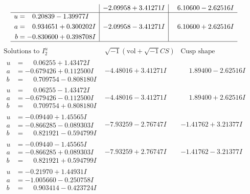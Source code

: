 \documentclass[1p]{elsarticle_modified}
\theoremstyle{definition}
\newcommand{\I}{\sqrt{-1}}
\begin{document}
$$\begin{array}{c|c|c}
 & -2.09958 + 3.41271 I & \phantom{-}6.10600 - 2.62516 I \\ \hline\begin{aligned}
u &= \phantom{-}0.20839 - 1.39977 I \\
a &= \phantom{-}0.934651 + 0.300202 I \\
b &= -0.830600 + 0.398708 I\end{aligned}
 & -2.09958 - 3.41271 I & \phantom{-}6.10600 + 2.62516 I\\
 \hline 
 \end{array}$$\newpage$$\begin{array}{c|c|c}  
\text{Solutions to }I^u_{2}& \I (\text{vol} + \sqrt{-1}CS) & \text{Cusp shape}\\
 \hline 
\begin{aligned}
u &= \phantom{-}0.06255 + 1.43472 I \\
a &= -0.679426 + 0.112500 I \\
b &= \phantom{-}0.709754 - 0.808180 I\end{aligned}
 & -4.48016 + 3.41271 I & \phantom{-}1.89400 - 2.62516 I \\ \hline\begin{aligned}
u &= \phantom{-}0.06255 - 1.43472 I \\
a &= -0.679426 - 0.112500 I \\
b &= \phantom{-}0.709754 + 0.808180 I\end{aligned}
 & -4.48016 - 3.41271 I & \phantom{-}1.89400 + 2.62516 I \\ \hline\begin{aligned}
u &= -0.09440 + 1.45565 I \\
a &= -0.866285 - 0.089303 I \\
b &= \phantom{-}0.821921 - 0.594799 I\end{aligned}
 & -7.93259 - 2.76747 I & -1.41762 + 3.21377 I \\ \hline\begin{aligned}
u &= -0.09440 - 1.45565 I \\
a &= -0.866285 + 0.089303 I \\
b &= \phantom{-}0.821921 + 0.594799 I\end{aligned}
 & -7.93259 + 2.76747 I & -1.41762 - 3.21377 I \\ \hline\begin{aligned}
u &= -0.21970 + 1.44931 I \\
a &= -1.005660 - 0.250758 I \\
b &= \phantom{-}0.903414 - 0.423724 I\end{aligned}

\end{array}$$
\end{document}
